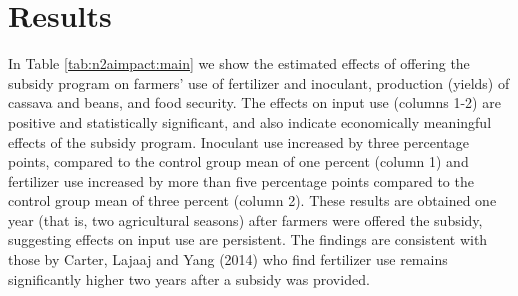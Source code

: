 
{}
\section{Results}
In Table \ref{tab:n2aimpact:main} we show the estimated effects of offering the subsidy program on farmers’ use of fertilizer and inoculant, production (yields) of cassava and beans, and food security. The effects on input use (columns 1-2) are positive and statistically significant, and also indicate economically meaningful effects of the subsidy program. Inoculant use increased by three percentage points, compared to the control group mean of one percent (column 1) and fertilizer use increased by more than five percentage points compared to the control group mean of three percent (column 2). These results are obtained one year (that is, two agricultural seasons) after farmers were offered the subsidy, suggesting effects on input use are persistent.  The findings are consistent with those by Carter, Lajaaj and Yang (2014) who find fertilizer use remains significantly higher two years after a subsidy was provided. 

\newcommand{\specialcell}[2][c]{%
  \begin{tabular}[#1]{@{}c@{}}#2\end{tabular}}




